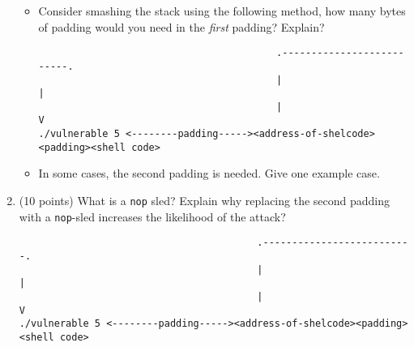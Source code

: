 \documentclass{article}[9pt]
\begin{document}
\begin{enumerate}
\begin{itemize}
\item Consider smashing the stack using the following method, how
many bytes of padding would you need in the \emph{first} padding? Explain?

\begin{verbatim}
                                         .--------------------------.
                                         |                          |
                                         |                          V
./vulnerable 5 <--------padding-----><address-of-shelcode><padding><shell code>
\end{verbatim}

\item In some cases, the second padding is needed. Give one example case.
\end{itemize}

\item (10 points) What is a \texttt{nop} sled? Explain why replacing the second padding
with a \texttt{nop}-sled increases the likelihood of the attack?
\begin{verbatim}
                                         .--------------------------.
                                         |                          |
                                         |                          V
./vulnerable 5 <--------padding-----><address-of-shelcode><padding><shell code>
\end{verbatim}
\end{enumerate}
\end{document}
